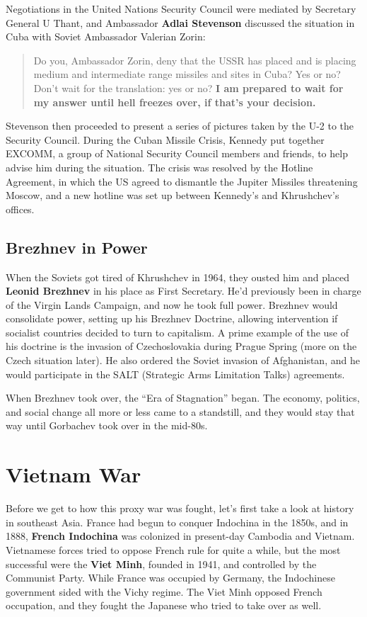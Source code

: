 Negotiations in the United Nations Security Council were mediated by Secretary General U Thant,
and Ambassador \textbf{Adlai Stevenson}
discussed the situation in Cuba with Soviet Ambassador Valerian Zorin:
\begin{quote}
  Do you, Ambassador Zorin, deny that the USSR has placed
  and is placing medium and intermediate range missiles and sites in Cuba?
  Yes or no?
  Don't wait for the translation: yes or no?
  \textbf{I am prepared to wait for my answer until hell freezes over, if that's your decision.}
\end{quote}
Stevenson then proceeded to present a series of pictures taken by the U-2 to the Security Council.
During the Cuban Missile Crisis, Kennedy put together EXCOMM,
a group of National Security Council members and friends, to help advise him during the situation.
The crisis was resolved by the Hotline Agreement,
in which the US agreed to dismantle the Jupiter Missiles threatening Moscow,
and a new hotline was set up between Kennedy's and Khrushchev's offices.

\subsection*{Brezhnev in Power}

When the Soviets got tired of Khrushchev in 1964,
they ousted him and placed \textbf{Leonid Brezhnev} in his place as First Secretary.
He'd previously been in charge of the Virgin Lands Campaign, and now he took full power.
Brezhnev would consolidate power, setting up his Brezhnev Doctrine,
allowing intervention if socialist countries decided to turn to capitalism.
A prime example of the use of his doctrine is the invasion of Czechoslovakia during Prague Spring
(more on the Czech situation later).
He also ordered the Soviet invasion of Afghanistan,
and he would participate in the SALT (Strategic Arms Limitation Talks) agreements.

When Brezhnev took over, the ``Era of Stagnation'' began.
The economy, politics, and social change all more or less came to a standstill,
and they would stay that way until Gorbachev took over in the mid-80s.

\section{Vietnam War}

Before we get to how this proxy war was fought,
let's first take a look at history in southeast Asia.
France had begun to conquer Indochina in the 1850s, and in 1888,
\textbf{French Indochina} was colonized in present-day Cambodia and Vietnam.
Vietnamese forces tried to oppose French rule for quite a while,
but the most successful were the \textbf{Viet Minh}, founded in 1941,
and controlled by the Communist Party.
While France was occupied by Germany, the Indochinese government sided with the Vichy regime.
The Viet Minh opposed French occupation,
and they fought the Japanese who tried to take over as well.

